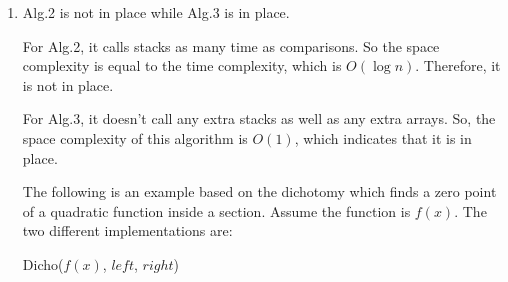 \documentclass[12pt,a4paper]{article}
\makeatletter
\newtheorem*{solution}{Solution}
\theoremstyle{definition}
\renewenvironment{solution}[1][Solution] {\par\pushQED{\qed}\normalfont\topsep6\p@\@plus6\p@\relax\trivlist\item[\hskip\labelsep\bfseries#1\@addpunct{.}]\ignorespaces}{\popQED\endtrivlist\@endpefalse} \makeatother
\makeatother
\begin{document}
\begin{enumerate}
\begin{minipage}[t]{0.49\textwidth}
\begin{algorithm}[H]
    
\end{algorithm}
\end{minipage}
\begin{minipage}[t]{0.455\textwidth}
\begin{algorithm}[H]
\BlankLine
	\caption{BinSearch($a[\cdot]$, $x$, $low$, $high$)} \label{Alg-NonRecursiveBS}
		
	\BlankLine	
	;
\end{algorithm}\end{minipage}
\begin{solution}
Alg.2 is not in place while Alg.3 is in place.

For Alg.2, it calls stacks as many time as comparisons. So the space complexity is equal to the time complexity, which is $O(\log n)$. Therefore, it is not in place.

For Alg.3, it doesn't call any extra stacks as well as any extra arrays. So, the space complexity of this algorithm is $O(1)$, which indicates that it is in place.

The following is an example based on the dichotomy which finds a zero point of a quadratic function inside a section. Assume the function is $f(x)$. The two different implementations are:


\begin{minipage}[t]{0.49\textwidth}
\begin{algorithm}[H]
	\BlankLine
	\caption{Dicho($f(x)$, $left$, $right$)} \label{Alg-RecursiveDC}
	\BlankLine
    

\end{algorithm}
\end{minipage}
\end{solution}
\end{enumerate}
\end{document}
